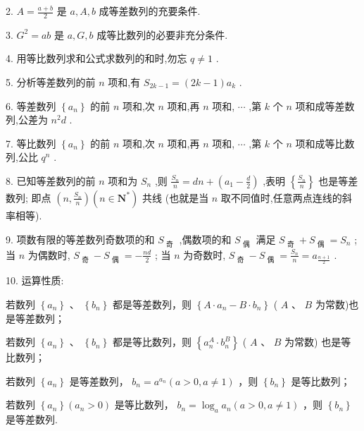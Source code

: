 2. $A = \frac{a + b}{2}$ 是 $a,A,b$ 成等差数列的充要条件.

3. ${G}^{2} = {ab}$ 是 $a,G,b$ 成等比数列的必要非充分条件.

4. 用等比数列求和公式求数列的和时,勿忘 $q \neq  1$ .

5. 分析等差数列的前 $n$ 项和,有 ${S}_{{2k} - 1} = \left( {{2k} - 1}\right) {a}_{k}$ .

6. 等差数列 $\left\{  {a}_{n}\right\}$ 的前 $n$ 项和,次 $n$ 项和,再 $n$ 项和, $\cdots$ ,第 $k$ 个 $n$ 项和成等差数列,公差为 ${n}^{2}d$ .

7. 等比数列 $\left\{  {a}_{n}\right\}$ 的前 $n$ 项和,次 $n$ 项和,再 $n$ 项和, $\cdots$ ,第 $k$ 个 $n$ 项和成等比数列,公比 ${q}^{n}$ .

8. 已知等差数列的前 $n$ 项和为 ${S}_{n}$ ,则 $\frac{{S}_{n}}{n} = {dn} + \left( {{a}_{1} - \frac{d}{2}}\right)$ ,表明 $\left\{  \frac{{S}_{n}}{n}\right\}$ 也是等差数列; 即点 $\left( {n,\frac{{S}_{n}}{n}}\right) \left( {n \in  {\mathbf{N}}^{ * }}\right)$ 共线 (也就是当 $n$ 取不同值时,任意两点连线的斜率相等).

9. 项数有限的等差数列奇数项的和 ${S}_{\text{ 奇 }}$ ,偶数项的和 ${S}_{\text{ 偶 }}$ 满足 ${S}_{\text{ 奇 }} + {S}_{\text{ 偶 }} = {S}_{n}$ ; 当 $n$ 为偶数时, ${S}_{\text{ 奇 }} - {S}_{\text{ 偶 }} =  - \frac{nd}{2}$ ; 当 $n$ 为奇数时, ${S}_{\text{ 奇 }} - {S}_{\text{ 偶 }} = \frac{{S}_{n}}{n} = {a}_{\frac{n + 1}{2}}$ .

10. 运算性质:

   若数列 $\left\{  {a}_{n}\right\}$ 、 $\left\{  {b}_{n}\right\}$ 都是等差数列，则 $\left\{  {A \cdot  {a}_{n} - B \cdot  {b}_{n}}\right\}$ ( $A$ 、 $B$ 为常数)也是等差数列；

  若数列 $\left\{  {a}_{n}\right\}$ 、 $\left\{  {b}_{n}\right\}$ 都是等比数列，则 $\left\{  {{a}_{n}^{A} \cdot  {b}_{n}^{B}}\right\}$ ( $A$ 、 $B$ 为常数) 也是等比数列；

  若数列 $\left\{  {a}_{n}\right\}$ 是等差数列， ${b}_{n} = {a}^{{a}_{n}}\left( {a > 0,a \neq  1}\right)$ ，则 $\left\{  {b}_{n}\right\}$ 是等比数列；

  若数列 $\left\{  {a}_{n}\right\}  \left( {{a}_{n} > 0}\right)$ 是等比数列， ${b}_{n} = {\log }_{a}{a}_{n}\left( {a > 0,a \neq  1}\right)$ ，则 $\left\{  {b}_{n}\right\}$ 是等差数列.

